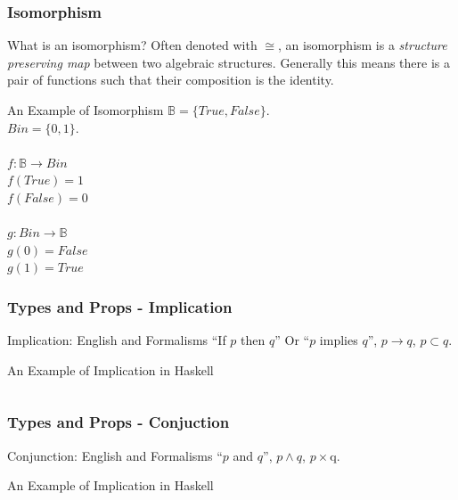 \documentclass
  [hyperref={colorlinks = true,linkcolor = blue, 
             citecolor = blue, urlcolor = blue}
  ]{beamer}
\begin{document}
\begin{frame}[fragile]
  \frametitle{Isomorphism}
  \begin{block}{What is an isomorphism?}
    Often denoted with $\cong$, an isomorphism is a \textit{structure
    preserving map} between two algebraic structures. Generally this means
    there is a pair of functions such that their composition is the identity.
  \end{block}
  \begin{block}{An Example of Isomorphism}
    $\mathbb{B} = \{True, False\}.$ \\
    $Bin = \{0, 1\}.$ \\
    $\;$ \\
    $f : \mathbb{B} \rightarrow Bin$ \\
    $f(True) = 1$ \\
    $f(False) = 0$ \\
    $\;$ \\
    $g : Bin \rightarrow \mathbb{B}$ \\
    $g(0) = False$ \\
    $g(1) = True$
  \end{block}
\end{frame}

\begin{frame}[fragile]
  \frametitle{Types and Props - Implication}
  \begin{block}{Implication: English and Formalisms}
  ``If $p$ then $q$'' Or ``$p$ implies $q$'', $p \rightarrow q$, $p \subset q$.
  \end{block}
  \begin{block}{An Example of Implication in Haskell}
  \inputminted{Haskell}{../Code/src/Implication.hs}
  \end{block}
\end{frame}

\begin{frame}[fragile]
  \frametitle{Types and Props - Conjuction}
  \begin{block}{Conjunction: English and Formalisms}
  ``$p$ and $q$'', $p \land q$, $p \times $q.
  \end{block}
  \begin{block}{An Example of Implication in Haskell}
  \inputminted{Haskell}{../Code/src/Conjunction.hs}
  \end{block}
\end{frame}
\end{document}
